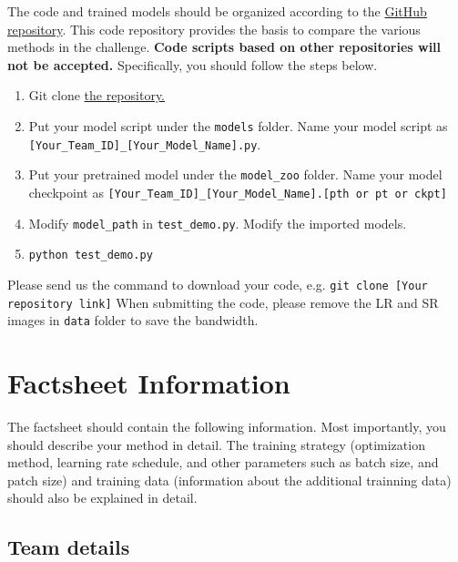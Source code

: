 \documentclass[10pt,twocolumn,letterpaper]{article}
\begin{document}
The code and trained models should be organized according to the \href{https://github.com/ofsoundof/NTIRE2023_ESR}{GitHub repository}. This code repository provides the basis to compare the various methods in the challenge. \textbf{Code scripts based on other repositories will not be accepted.} Specifically, you should follow the steps below.
\begin{enumerate}
    \item Git clone \href{https://github.com/ofsoundof/NTIRE2023_ESR}{the repository.}
    \item Put your model script under the \texttt{models} folder. Name your model script as \texttt{[Your\_Team\_ID]\_[Your\_Model\_Name].py}.
    \item Put your pretrained model under the \texttt{model\_zoo} folder. Name your model checkpoint as \texttt{[Your\_Team\_ID]\_[Your\_Model\_Name].[pth or pt or ckpt]}
    \item Modify \texttt{model\_path} in \texttt{test\_demo.py}. Modify the imported models.
    \item \texttt{python test\_demo.py}
\end{enumerate}
Please send us the command to download your code, e.g. \texttt{git clone [Your repository link]}
When submitting the code, please remove the LR and SR images in \texttt{data} folder to save the bandwidth.

\section{Factsheet Information}

The factsheet should contain the following information. Most importantly, you should describe your method in detail. The training strategy (optimization method, learning rate schedule, and other parameters such as batch size, and patch size) and training data (information about the additional trainning data) should also be explained in detail.

\subsection{Team details}
\end{document}
